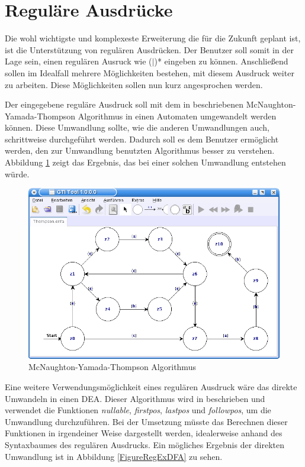 \section{Reguläre Ausdrücke}

Die wohl wichtigste und komplexeste Erweiterung die für die Zukunft geplant
ist, ist die Unterstützung von regulären Ausdrücken. Der Benutzer soll somit in
der Lage sein, einen regulären Ausruck wie
($\mid$)* eingeben zu können.
Anschließend sollen im Idealfall mehrere Möglichkeiten bestehen, mit diesem
Ausdruck weiter zu arbeiten. Diese Möglichkeiten sollen nun kurz angesprochen
werden.\vspace{10pt}

Der eingegebene reguläre Ausdruck soll mit dem in 
beschriebenen McNaughton-Yamada-Thompson Algorithmus in einen Automaten
umgewandelt werden können. Diese Umwandlung sollte, wie die anderen
Umwandlungen auch, schrittweise durchgeführt werden. Dadurch soll es dem
Benutzer ermöglicht werden, den zur Umwandlung benutzten Algorithmus besser zu
verstehen. Abbildung \ref{FigureThompson} zeigt das Ergebnis, das bei einer
solchen Umwandlung entstehen würde.\vspace{10pt}

\begin{figure}[h!]
\begin{center}
\includegraphics[width=12cm]{../images/thompson.png}
\caption{McNaughton-Yamada-Thompson Algorithmus}
\label{FigureThompson}
\end{center}
\end{figure}

Eine weitere Verwendungsmöglichkeit eines regulären Ausdruck wäre das direkte
Umwandeln in einen DEA. Dieser Algorithmus wird in
 beschrieben und verwendet die Funktionen
\textit{nullable}, \textit{firstpos}, \textit{lastpos} und \textit{followpos},
um die Umwandlung durchzuführen. Bei der Umsetzung müsste das Berechnen dieser
Funktionen in irgendeiner Weise dargestellt werden, idealerweise anhand des
Syntaxbaumes des regulären Ausdrucks. Ein mögliches Ergebnis der direkten
Umwandlung ist in Abbildung \ref{FigureRegExDFA} zu sehen.

